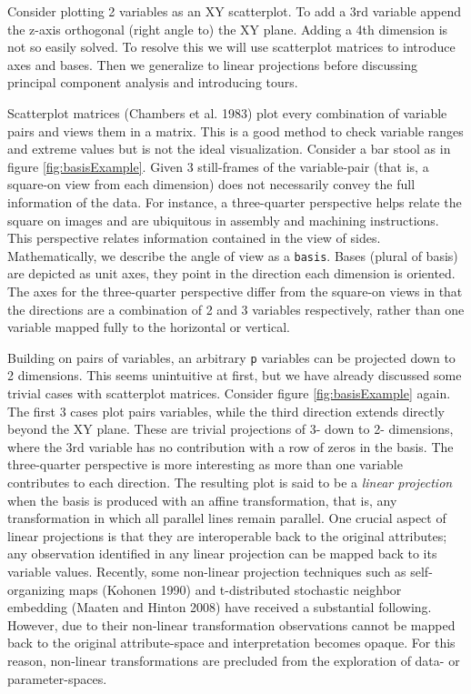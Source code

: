 \documentclass[
  11,
]{article}
\begin{document}
Consider plotting 2 variables as an XY scatterplot. To add a 3rd variable append the z-axis orthogonal (right angle to) the XY plane. Adding a 4th dimension is not so easily solved. To resolve this we will use scatterplot matrices to introduce axes and bases. Then we generalize to linear projections before discussing principal component analysis and introducing tours.

Scatterplot matrices (Chambers et al. 1983) plot every combination of variable pairs and views them in a matrix. This is a good method to check variable ranges and extreme values but is not the ideal visualization. Consider a bar stool as in figure \ref{fig:basisExample}. Given 3 still-frames of the variable-pair (that is, a square-on view from each dimension) does not necessarily convey the full information of the data. For instance, a three-quarter perspective helps relate the square on images and are ubiquitous in assembly and machining instructions. This perspective relates information contained in the view of sides. Mathematically, we describe the angle of view as a \texttt{basis}. Bases (plural of basis) are depicted as unit axes, they point in the direction each dimension is oriented. The axes for the three-quarter perspective differ from the square-on views in that the directions are a combination of 2 and 3 variables respectively, rather than one variable mapped fully to the horizontal or vertical.

Building on pairs of variables, an arbitrary \texttt{p} variables can be projected down to 2 dimensions. This seems unintuitive at first, but we have already discussed some trivial cases with scatterplot matrices. Consider figure \ref{fig:basisExample} again. The first 3 cases plot pairs variables, while the third direction extends directly beyond the XY plane. These are trivial projections of 3- down to 2- dimensions, where the 3rd variable has no contribution with a row of zeros in the basis. The three-quarter perspective is more interesting as more than one variable contributes to each direction. The resulting plot is said to be a \emph{linear projection} when the basis is produced with an affine transformation, that is, any transformation in which all parallel lines remain parallel. One crucial aspect of linear projections is that they are interoperable back to the original attributes; any observation identified in any linear projection can be mapped back to its variable values. Recently, some non-linear projection techniques such as
self-organizing maps (Kohonen 1990) and t-distributed stochastic neighbor embedding (Maaten and Hinton 2008) have received a substantial following. However, due to their non-linear transformation observations cannot be mapped back to the original attribute-space and interpretation becomes opaque. For this reason, non-linear transformations are precluded from the exploration of data- or parameter-spaces.
\end{document}
